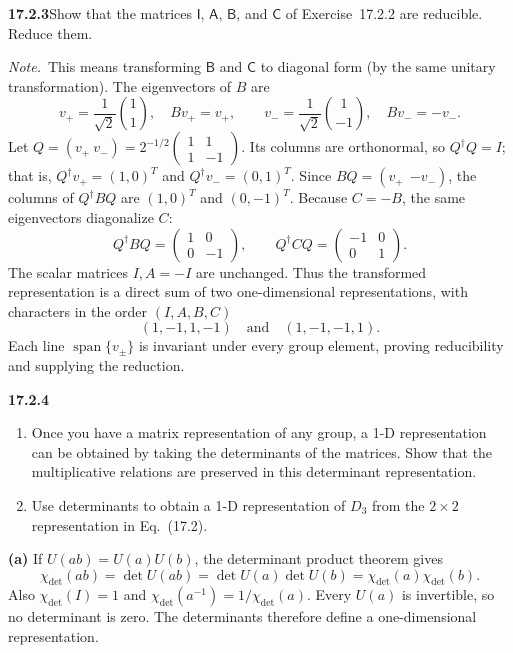 \par\bigskip
\noindent\textbf{17.2.3}\quad Show that the matrices $\mathsf{I}$,
$\mathsf{A}$, $\mathsf{B}$, and $\mathsf{C}$ of Exercise~17.2.2 are
reducible. Reduce them.
\par\emph{Note.}~This means transforming $\mathsf{B}$ and
$\mathsf{C}$ to diagonal form (by the same unitary transformation).
\solution
The eigenvectors of $B$ are
\[
v_+=\frac1{\sqrt2}\binom11,\quad Bv_+=v_+,\qquad
v_-=\frac1{\sqrt2}\binom1{-1},\quad Bv_-=-v_-.
\]
Let $Q=(v_+\ v_-)=2^{-1/2}\begin{pmatrix}1&1\\1&-1\end{pmatrix}$.
Its columns are orthonormal, so $Q^\dagger Q=I$; that is,
$Q^\dagger v_+=(1,0)^T$ and $Q^\dagger v_-=(0,1)^T$.
Since $BQ=(v_+\ \ {-v_-})$, the columns of $Q^\dagger BQ$ are
$(1,0)^T$ and $(0,-1)^T$. Because $C=-B$,
the same eigenvectors diagonalize $C$:
\[
Q^\dagger BQ=\begin{pmatrix}1&0\\0&-1\end{pmatrix},\qquad
Q^\dagger CQ=\begin{pmatrix}-1&0\\0&1\end{pmatrix}.
\]
The scalar matrices $I,A=-I$ are unchanged. Thus the transformed
representation is a direct sum of two one-dimensional representations,
with characters in the order $(I,A,B,C)$
\[
\boxed{(1,-1,1,-1)\quad\text{and}\quad(1,-1,-1,1)}.
\]
Each line $\operatorname{span}\{v_\pm\}$ is invariant under every
group element, proving reducibility and supplying the reduction.

\par\bigskip
\noindent\textbf{17.2.4}
\begin{enumerate}
\item[(a)] Once you have a matrix representation of any group, a 1-D
representation can be obtained by taking the determinants of the
matrices. Show that the multiplicative relations are preserved in
this determinant representation.
\item[(b)] Use determinants to obtain a 1-D representation of
$D_{3}$ from the $2\times2$ representation in Eq.~(17.2).
\end{enumerate}
\solution
\textbf{(a)} If $U(ab)=U(a)U(b)$, the determinant product theorem gives
\[
\chi_{\det}(ab)=\det U(ab)
=\det U(a)\det U(b)=\chi_{\det}(a)\chi_{\det}(b).
\]
Also $\chi_{\det}(I)=1$ and
$\chi_{\det}(a^{-1})=1/\chi_{\det}(a)$.
Every $U(a)$ is invertible, so no determinant is zero.
The determinants therefore define a one-dimensional representation.

